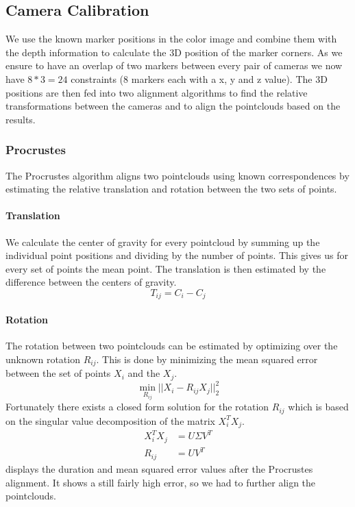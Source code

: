 \documentclass[10pt,twocolumn,letterpaper]{article}
\begin{document}
\subsection{Camera Calibration}
We use the known marker positions in the color image and combine them with the depth information to calculate the 3D position of the marker corners. As we ensure to have an overlap of two markers between every pair of cameras we now have $8*3=24$ constraints (8 markers each with a x, y and z value). The 3D positions are then fed into two alignment algorithms to find the relative transformations between the cameras and to align the pointclouds based on the results.
%
\subsubsection{Procrustes}
The Procrustes algorithm aligns two pointclouds using known correspondences by estimating the relative translation and rotation between the two sets of points.
\paragraph{Translation}
We calculate the center of gravity for every pointcloud by summing up the individual point positions and dividing by the number of points. This gives us for every set of points the mean point. The translation is then estimated by the difference between the centers of gravity.
\begin{equation}
	T_{ij} = C_i - C_j
\end{equation}
\paragraph{Rotation}
The rotation between two pointclouds can be estimated by optimizing over the unknown rotation $R_{ij}$. This is done by minimizing the mean squared error between the set of points $X_i$ and the $X_j$.
\begin{equation}
	\min_{R_{ij}} || X_i - R_{ij} X_j ||^2_2
\end{equation}
Fortunately there exists a closed form solution for the rotation $R_{ij}$ which is based on the singular value decomposition of the matrix $X_i^T X_j$.
\begin{align}
	X_i^T X_j &= U \Sigma V^T \\
	R_{ij} &= UV^T
\end{align}
 displays the duration and mean squared error values after the Procrustes alignment. It shows a still fairly high error, so we had to further align the pointclouds.
%
\end{document}
